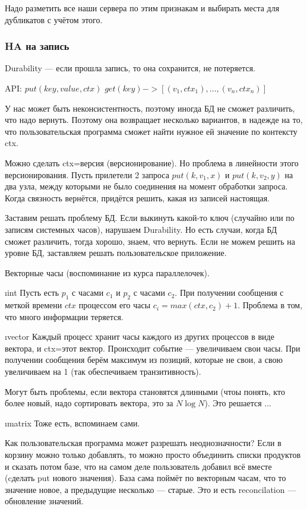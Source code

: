 Надо разметить все наши сервера по этим признакам и выбирать места для дубликатов с учётом этого.

\subsubsection{HA на запись}

Durability --- если прошла запись, то она сохранится, не потеряется.

API: $put(key, value, ctx)$
$get(key) -> [(v_1, ctx_1), \dots, (v_n, ctx_n)]$

У нас может быть неконсистентность, поэтому иногда БД не сможет различить, что надо вернуть. Поэтому она возвращает несколько вариантов, в надежде на то, что пользовательская программа сможет найти нужное ей значение по контексту ctx.

Можно сделать ctx=версия (версионирование).
Но проблема в линейности этого версионирования.
Пусть прилетели 2 запроса $put(k, v_1, x)$ и $put(k, v_2, y)$ на два узла, между которыми не было соединения на момент обработки запроса. Когда связность вернётся, придётся решить, какая из записей настоящая.

Заставим решать проблему БД.
Если выкинуть какой-то ключ (случайно или по записям системных часов), нарушаем Durability. Но есть случаи, когда БД сможет различить, тогда хорошо, знаем, что вернуть.
Если не можем решить на уровне БД, заставляем решать пользовательское приложение.

Векторные часы (воспоминание из курса параллелочек).
\begin{enumerate}
\i int
Пусть есть $p_1$ с часами $c_1$ и $p_2$ с часами $c_2$. При получении сообщения с меткой времени $ctx$ процессом его часы $c_i = max(ctx, c_2)+1$. 
Проблема в том, что много информации теряется.

\i vector
Каждый процесс хранит часы каждого из других процессов в виде вектора, и ctx=этот вектор. Происходит событие --- увеличиваем свои часы. При получении сообщения берём максимум из позиций, которые не свои, а свою увеличиваем на 1 (так обеспечиваем транзитивность).

Могут быть проблемы, если вектора становятся длинными (чтоы понять, кто более новый, надо сортировать вектора, это за $N \log N$). Это решается ...

\i matrix
Тоже есть, вспоминаем сами.
\end{enumerate}

Как пользовательская программа может разрешать неоднозначности?
Если в корзину можно только добавлять, то можно просто объединить списки продуктов и сказать потом базе, что на самом деле пользователь добавил всё вместе (cделать put нового значения). 
База сама поймёт по векторным часам, что то значение новое, а предыдущие несколько --- старые.
Это и есть reconcilation --- обновление значений.

